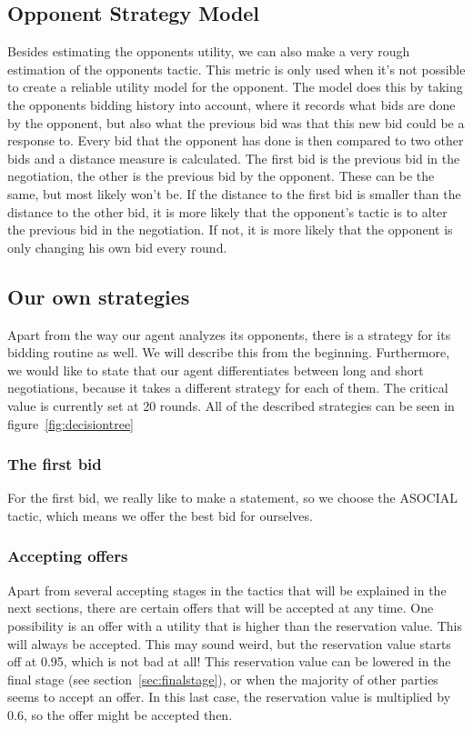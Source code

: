 \subsection{Opponent Strategy Model}
\label{sec:opponentstrategymodel}
Besides estimating the opponents utility, we can also make a very rough estimation of the opponents tactic. This metric is only used when it's not possible to create a reliable utility model for the opponent. The model does this by taking the opponents bidding history into account, where it records what bids are done by the opponent, but also what the previous bid was that this new bid could be a response to. Every bid that the opponent has done is then compared to two other bids and a distance measure is calculated. The first bid is the previous bid in the negotiation, the other is the previous bid by the opponent. These can be the same, but most likely won't be. If the distance to the first bid is smaller than the distance to the other bid, it is more likely that the opponent's tactic is to alter the previous bid in the negotiation. If not, it is more likely that the opponent is only changing his own bid every round. 

\subsection{Our own strategies}
\label{sec:strategy}
Apart from the way our agent analyzes its opponents, there is a strategy for its bidding routine as well. We will describe this from the beginning. Furthermore, we would like to state that our agent differentiates between long and short negotiations, because it takes a different strategy for each of them. The critical value is currently set at 20 rounds. All of the described strategies can be seen in figure~\ref{fig:decisiontree}



\subsubsection{The first bid}
For the first bid, we really like to make a statement, so we choose the ASOCIAL tactic, which means we offer the best bid for ourselves.

\subsubsection{Accepting offers}
Apart from several accepting stages in the tactics that will be explained in the next sections, there are certain offers that will be accepted at any time. One possibility is an offer with a utility that is higher than the reservation value. This will always be accepted. This may sound weird, but the reservation value starts off at 0.95, which is not bad at all! This reservation value can be lowered in the final stage (see section~\ref{sec:finalstage}), or when the majority of other parties seems to accept an offer. In this last case, the reservation value is multiplied by 0.6, so the offer might be accepted then.

